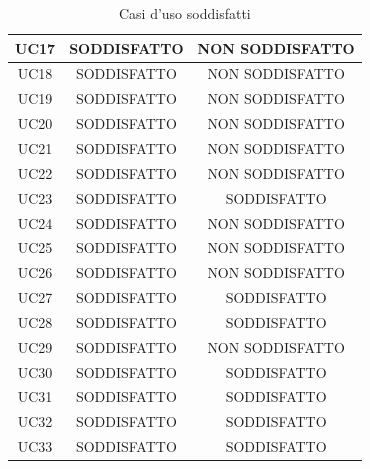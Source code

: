 \begin{table}[hp]
\begin{tabular}{|c|c|c|}
UC17         & SODDISFATTO                       & NON SODDISFATTO                \\ \hline
UC18         & SODDISFATTO                       & NON SODDISFATTO                \\ \hline
UC19         & SODDISFATTO                       & NON SODDISFATTO                \\ \hline
UC20         & SODDISFATTO                       & NON SODDISFATTO                \\ \hline
UC21         & SODDISFATTO                       & NON SODDISFATTO                \\ \hline
UC22         & SODDISFATTO                       & NON SODDISFATTO                \\ \hline
UC23         & SODDISFATTO                       & SODDISFATTO                \\ \hline
UC24         & SODDISFATTO                       & NON SODDISFATTO                \\ \hline
UC25         & SODDISFATTO                       & NON SODDISFATTO                \\ \hline
UC26         & SODDISFATTO                       & NON SODDISFATTO                \\ \hline
UC27         & SODDISFATTO                       & SODDISFATTO                \\ \hline
UC28         & SODDISFATTO                       & SODDISFATTO                \\ \hline
UC29         & SODDISFATTO                       & NON SODDISFATTO                \\ \hline
UC30         & SODDISFATTO                       & SODDISFATTO                \\ \hline
UC31         & SODDISFATTO                       & SODDISFATTO                \\ \hline
UC32         & SODDISFATTO                       & SODDISFATTO                \\ \hline
UC33         & SODDISFATTO                       & SODDISFATTO                \\ \hline

\end{tabular}
\caption{Casi d'uso soddisfatti}
\end{table}
\clearpage

